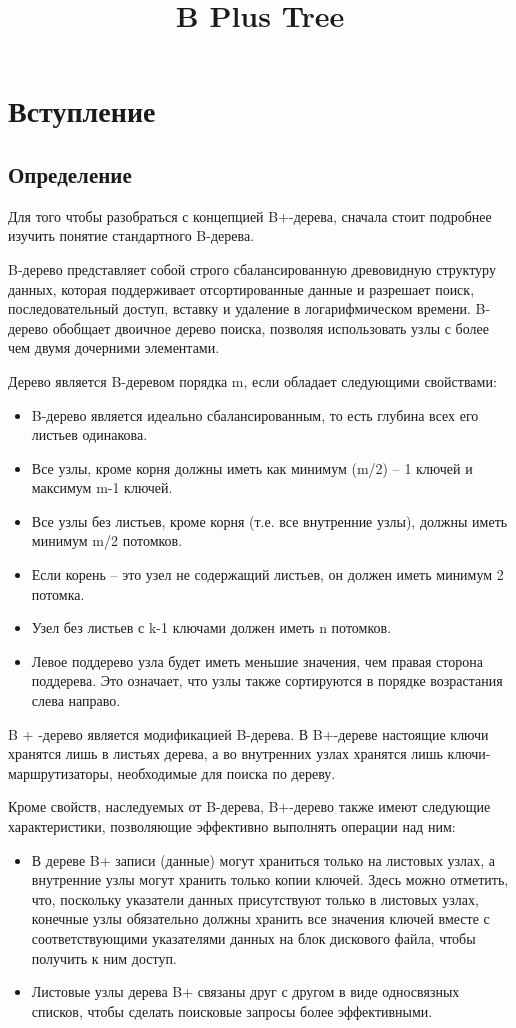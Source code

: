 \documentclass{article}
\title{B Plus Tree}
\begin{document}
\maketitle

\section{Вступление}
\subsection{Определение}
Для того чтобы разобраться с концепцией B+-дерева, сначала стоит подробнее изучить понятие стандартного B-дерева.

B-дерево представляет собой строго сбалансированную древовидную структуру данных, которая поддерживает отсортированные данные и разрешает поиск, последовательный доступ, вставку и удаление в логарифмическом времени. B-дерево обобщает двоичное дерево поиска, позволяя использовать узлы с более чем двумя дочерними элементами.  

Дерево является B-деревом порядка m, если обладает следующими свойствами:
\begin{itemize}
\item B-дерево является идеально сбалансированным, то есть глубина всех его листьев одинакова. 
\item Все узлы, кроме корня должны иметь как минимум (m/2) – 1 ключей и максимум m-1 ключей. 
\item Все узлы без листьев, кроме корня (т.е. все внутренние узлы), должны иметь минимум m/2 потомков. 
\item Если корень – это узел не содержащий листьев, он должен иметь минимум 2 потомка. 
\item Узел без листьев с k-1 ключами должен иметь n потомков. 
\item Левое поддерево узла будет иметь меньшие значения, чем правая сторона поддерева. Это означает, что узлы также сортируются в порядке возрастания слева направо.
\end{itemize}

B + -дерево является модификацией B-дерева. В B+-дереве настоящие ключи хранятся лишь в листьях дерева, а во внутренних узлах хранятся лишь ключи-маршрутизаторы, необходимые для поиска по дереву. 

Кроме свойств, наследуемых от B-дерева, B+-дерево также имеют следующие характеристики, позволяющие эффективно выполнять операции над ним:
\begin{itemize}
\item В дереве B+ записи (данные) могут храниться только на листовых узлах, а внутренние узлы могут хранить только копии ключей.  Здесь можно отметить, что, поскольку указатели данных присутствуют только в листовых узлах, конечные узлы обязательно должны хранить все значения ключей вместе с соответствующими указателями данных на блок дискового файла, чтобы получить к ним доступ. 
\item Листовые узлы дерева B+ связаны друг с другом в виде односвязных списков, чтобы сделать поисковые запросы более эффективными. 
\end{itemize}
\end{document}
